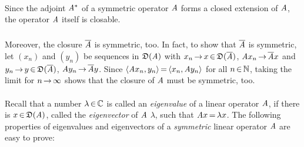 \documentclass[11pt,twoside]{article}
\begin{document}

\paragraph*{}
Since the adjoint $\mathit{A}^*$ of a symmetric operator $\mathit{A}$
forms a closed extension of $\mathit{A}$,
the operator $\mathit{A}$ itself is closable.

\subparagraph*{}
Moreover,
the closure $\overline{\mathit{A}}$ is symmetric, too.
In fact,
to show that $\overline{\mathit{A}}$ is symmetric,
let $(x_n)$ and $(y_n)$ be sequences in $\mathfrak{D}(\mathit{A})$
with $x_n {\,\to\,} x {\,\in\,} \mathfrak{D}(\overline{\mathit{A}})$,
$\mathit{A} x_n {\,\to\,} \overline{\mathit{A}} x$
and $y_n {\,\to\,} y {\,\in\,} \mathfrak{D}(\overline{\mathit{A}})$,
$\mathit{A} y_n {\,\to\,} \overline{\mathit{A}} y$.
Since $\langle \mathit{A} x_n,y_n \rangle {\,=\,} \langle x_n,\mathit{A} y_n \rangle$
for all $n {\,\in\,} {\mathbb{N}}$,
taking the limit for $n {\,\to\,} \infty$ shows
that the closure of $\mathit{A}$ must be symmetric, too.

\paragraph*{}
Recall that a number $\lambda {\,\in\,} {\mathbb{C}}$ is called an \textit{eigenvalue}
of a linear operator $\mathit{A}$,
if there is $x {\,\in\,} \mathfrak{D}(\mathit{A})$,
called the \textit{eigenvector} of $\mathit{A}$ {\wrt} $\lambda$,
such that $\mathit{A} x {\,=\,} \lambda x$.
The following properties of eigenvalues and eigenvectors
of a \textit{symmetric} linear operator $\mathit{A}$ are easy to prove:
\end{document}

